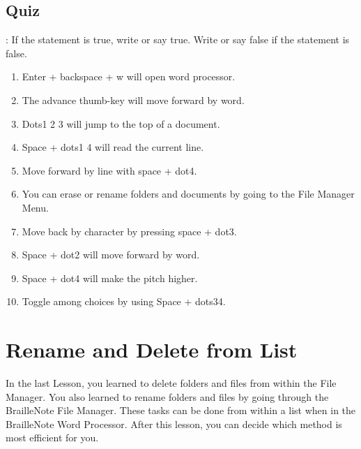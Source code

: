 \documentclass[10pt,letterpaper,twoside]{report}
\begin{document}
\clearpage
\subsection{Quiz}:
If the statement is true, write or say true. Write or say false if the statement is false.
\begin{enumerate}
	\item Enter + backspace + w will open word processor.
	\item The advance thumb-key will move forward by word.
	\item Dots1 2 3 will jump to the top of a document.
	\item Space + dots1 4 will read the current line.
	\item Move forward by line with space + dot4.
	\item You can erase or rename folders and documents by going to the File Manager Menu.
	\item Move back by character by pressing space + dot3.
	\item Space + dot2 will move forward by word.
	\item Space + dot4 will make the pitch higher.
	\item Toggle among choices by using Space + dots34.
\end{enumerate}

\clearpage
\section{Rename and Delete from List}
In the last Lesson, you learned to delete folders and files from within the File Manager. You also learned to rename folders and files by going through the BrailleNote File Manager. These tasks can be done from within a list when in the BrailleNote Word Processor. After this lesson, you can decide which method is most efficient for you.
\end{document}
